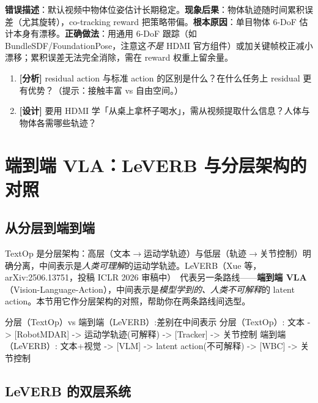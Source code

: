 \begin{pitfall}[物体位姿估计的累积漂移]
\textbf{错误描述}：默认视频中物体位姿估计长期稳定。\textbf{现象后果}：物体轨迹随时间累积误差（尤其旋转），co-tracking reward 把策略带偏。\textbf{根本原因}：单目物体 6-DoF 估计本身有漂移。\textbf{正确做法}：用通用 6-DoF 跟踪（如 BundleSDF/FoundationPose，注意这\emph{不是} HDMI 官方组件）或加关键帧校正减小漂移；累积误差无法完全消除，需在 reward 权重上留余量。
\end{pitfall}

\begin{practice}[练习·HDMI]
\begin{enumerate}
  \item \textbf{[分析]} residual action 与标准 action 的区别是什么？在什么任务上 residual 更有优势？（提示：接触丰富 vs 自由空间。）
  \item \textbf{[设计]} 要用 HDMI 学「从桌上拿杯子喝水」，需从视频提取什么信息？人体与物体各需哪些轨迹？
\end{enumerate}
\end{practice}

\section{端到端 VLA：LeVERB 与分层架构的对照}
\label{sec:rlmc-mm-leverb}

\subsection{从分层到端到端}
\label{sec:rlmc-mm-leverb-pos}

TextOp 是分层架构：高层（文本$\to$运动学轨迹）与低层（轨迹$\to$关节控制）明确分离，中间表示是\emph{人类可理解}的运动学轨迹。LeVERB（Xue 等，arXiv:2506.13751，投稿 ICLR 2026 审稿中）\,\cite{xue2025leverb} 代表另一条路线——\textbf{端到端 VLA}（Vision-Language-Action），中间表示是\emph{模型学到的、人类不可解释}的 latent action。本节用它作分层架构的对照，帮助你在两条路线间选型。

\begin{codebox}{分层（TextOp）vs 端到端（LeVERB）:差别在中间表示}
分层（TextOp）:  文本 -> [RobotMDAR] -> 运动学轨迹(可解释) -> [Tracker] -> 关节控制
端到端（LeVERB）: 文本+视觉 -> [VLM] -> latent action(不可解释) -> [WBC] -> 关节控制
\end{codebox}

\subsection{LeVERB 的双层系统}
\label{sec:rlmc-mm-leverb-arch}

